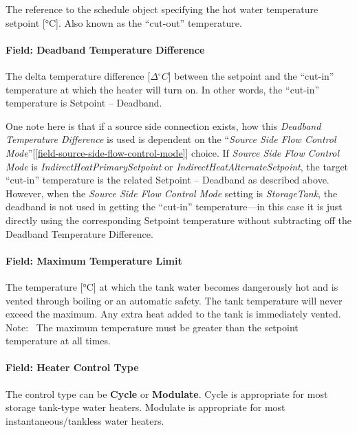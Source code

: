 The reference to the schedule object specifying the hot water temperature setpoint {[}°C{]}. Also known as the ``cut-out'' temperature.

\paragraph{Field: Deadband Temperature Difference}\label{field-deadband-temperature-difference-000}

The delta temperature difference {[}$\Delta{^\circ}C${]} between the setpoint and the ``cut-in'' temperature at which the heater will turn on. In other words, the ``cut-in'' temperature is Setpoint -- Deadband.

One note here is that if a source side connection exists, how this \emph{Deadband Temperature Difference} is used is dependent on the ``\emph{Source Side Flow Control Mode}''{[}\ref{field-source-side-flow-control-mode}{]} choice. If \emph{Source Side Flow Control Mode} is \emph{IndirectHeatPrimarySetpoint} or
\emph{IndirectHeatAlternateSetpoint}, the target ``cut-in'' temperature is the related Setpoint -- Deadband as described above. However, when the \emph{Source Side Flow Control Mode} setting is \emph{StorageTank}, the deadband is not used in getting the ``cut-in'' temperature---in this case it is just directly using the corresponding Setpoint temperature without subtracting off the Deadband Temperature Difference.

\paragraph{Field: Maximum Temperature Limit}\label{field-maximum-temperature-limit}

The temperature {[}°C{]} at which the tank water becomes dangerously hot and is vented through boiling or an automatic safety. The tank temperature will never exceed the maximum. Any extra heat added to the tank is immediately vented. Note:~ The maximum temperature must be greater than the setpoint temperature at all times.

\paragraph{Field: Heater Control Type}\label{field-heater-control-type}

The control type can be \textbf{Cycle} or \textbf{Modulate}. Cycle is appropriate for most storage tank-type water heaters. Modulate is appropriate for most instantaneous/tankless water heaters.


